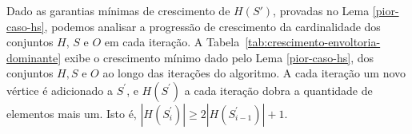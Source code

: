 




Dado as garantias mínimas de crescimento de $H(S')$, provadas no Lema \ref{pior-caso-hs}, podemos analisar a progressão de crescimento da cardinalidade dos conjuntos $H$, $S$ e $O$ em cada iteração. A Tabela~\ref{tab:crescimento-envoltoria-dominante} exibe o crescimento mínimo dado pelo Lema \ref{pior-caso-hs}, dos conjuntos $H, S$ e $O$ ao longo das iterações do algoritmo. A cada iteração um novo vértice é adicionado a $S^\prime$, e $H(S^\prime)$ a cada iteração dobra a quantidade de elementos mais um. Isto é, $|H(S^\prime_i)|\ge 2 |H(S^\prime_{i-1})| +1$. %



